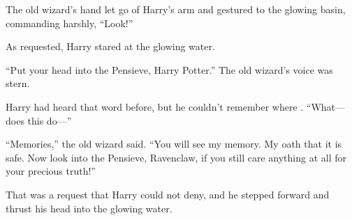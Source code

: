 The old wizard’s hand let go of Harry’s arm and gestured to the glowing basin, commanding harshly, “Look!”

As requested, Harry stared at the glowing water.

“Put your head into the Pensieve, Harry Potter.” The old wizard’s voice was stern.

Harry had heard that word before, but he couldn’t remember where . “What—does this do—”

“Memories,” the old wizard said. “You will see my memory. My oath that it is safe. Now look into the Pensieve, Ravenclaw, if you still care anything at all for your precious truth!”

That was a request that Harry could not deny, and he stepped forward and thrust his head into the glowing water.

\later

